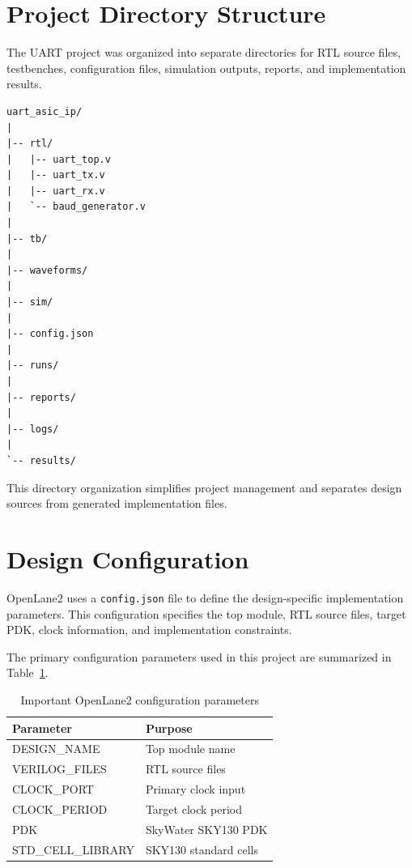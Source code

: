 
\section{Project Directory Structure}

The UART project was organized into separate directories for RTL source files, testbenches, configuration files, simulation outputs, reports, and implementation results.
\begin{verbatim}
uart_asic_ip/
|
|-- rtl/
|   |-- uart_top.v
|   |-- uart_tx.v
|   |-- uart_rx.v
|   `-- baud_generator.v
|
|-- tb/
|
|-- waveforms/
|
|-- sim/
|
|-- config.json
|
|-- runs/
|
|-- reports/
|
|-- logs/
|
`-- results/
\end{verbatim}

This directory organization simplifies project management and separates design sources from generated implementation files.


\section{Design Configuration}

OpenLane2 uses a \texttt{config.json} file to define the design-specific implementation parameters. This configuration specifies the top module, RTL source files, target PDK, clock information, and implementation constraints.

The primary configuration parameters used in this project are summarized in Table~\ref{tab:config}.

\begin{table}[!htbp]
\centering
\caption{Important OpenLane2 configuration parameters}
\label{tab:config}
\begin{tabular}{ll}
\toprule
Parameter & Purpose\\
\midrule
DESIGN\_NAME & Top module name\\
VERILOG\_FILES & RTL source files\\
CLOCK\_PORT & Primary clock input\\
CLOCK\_PERIOD & Target clock period\\
PDK & SkyWater SKY130 PDK\\
STD\_CELL\_LIBRARY & SKY130 standard cells\\
\bottomrule
\end{tabular}
\end{table}

